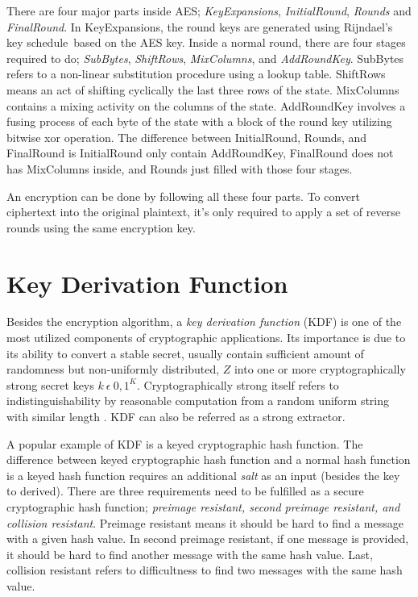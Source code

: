 There are four major parts inside AES; \textit{KeyExpansions}, \textit{InitialRound}, \textit{Rounds} and \textit{FinalRound}. In KeyExpansions, the round keys are generated using Rijndael's key schedule based on the AES key.
Inside a normal round, there are four stages required to do; \textit{SubBytes}, \textit{ShiftRows}, \textit{MixColumns}, and \textit{AddRoundKey}.
SubBytes refers to a non-linear substitution procedure using a lookup table. ShiftRows means an act of shifting cyclically the last three rows of the state. MixColumns contains a mixing activity on the columns of the state.
AddRoundKey involves a fusing process of each byte of the state with a block of the round key utilizing bitwise xor operation. The difference between InitialRound, Rounds, and FinalRound is InitialRound only contain AddRoundKey, FinalRound does not has MixColumns inside, and Rounds just filled with those four stages.

An encryption can be done by following all these four parts. To convert ciphertext into the original plaintext, it's only required to apply a set of reverse rounds using the same encryption key.

\section{Key Derivation Function}
Besides the encryption algorithm, a \textit{key derivation function} (KDF) is one of the most utilized components of cryptographic applications. Its importance is due to its ability to convert a stable secret, usually contain sufficient amount of randomness but non-uniformly distributed,  $Z$ into one or more cryptographically strong secret keys $k\ \epsilon\ {0,1}^K$.
Cryptographically strong itself refers to indistinguishability by reasonable computation from a random uniform string with similar length \cite{key_derivation}.
KDF can also be referred as a strong extractor.

A popular example of KDF is a keyed cryptographic hash function. The difference between keyed cryptographic hash function and a normal hash function is a keyed hash function requires an additional \textit{salt} as an input (besides the key to derived).
There are three requirements need to be fulfilled as a secure cryptographic hash function; \textit{preimage resistant, second preimage resistant, and collision resistant}. Preimage resistant means it should be hard to find a message with a given hash value. In second preimage resistant, if one message is provided, it should be hard to find another message with the same hash value.
Last, collision resistant refers to difficultness to find two messages with the same hash value.

